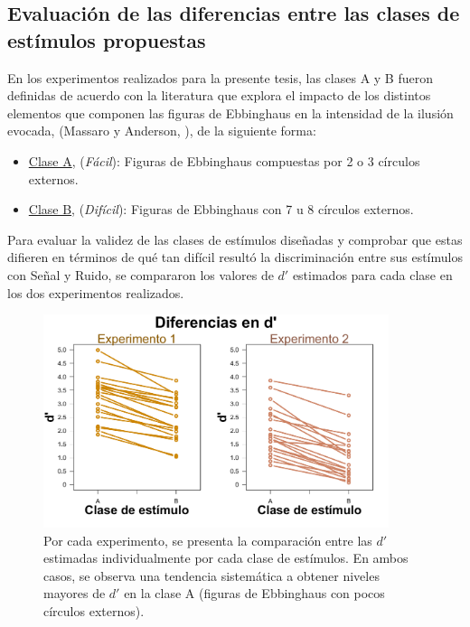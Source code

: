 \subsection{Evaluación de las diferencias entre las clases de estímulos propuestas}

En los experimentos realizados para la presente tesis, las clases A y B fueron definidas de acuerdo con la literatura que explora el impacto de los distintos elementos que componen las figuras de Ebbinghaus en la intensidad de la ilusión evocada, (Massaro y Anderson, \citeyear{Massaro1971}), de la siguiente forma: \\

\begin{itemize}
\item \underline{Clase A}, (\textit{Fácil}): Figuras de Ebbinghaus compuestas por 2 o 3 círculos externos.\\

\item \underline{Clase B}, (\textit{Difícil}): Figuras de Ebbinghaus con 7 u 8 círculos externos.\\
\end{itemize}

Para evaluar la validez de las clases de estímulos diseñadas y comprobar que estas difieren en términos de qué tan difícil resultó la discriminación entre sus estímulos con Señal y Ruido, se compararon los valores de $d'$ estimados para cada clase en los dos experimentos realizados.\\

\begin{figure}[th]
\centering
\includegraphics[width=0.90\textwidth]{Figures/Diff_D_E1yE2}
\decoRule
\caption[Resultados: Comparación de las $d'$ computadas por cada clase de estímulos]{Por cada experimento, se presenta la comparación entre  las $d'$ estimadas individualmente por cada clase de estímulos. En ambos casos, se observa una tendencia sistemática a obtener niveles mayores de $d'$ en la clase A (figuras de Ebbinghaus con pocos círculos externos).}
\label{fig:Diff_D}
\end{figure}


